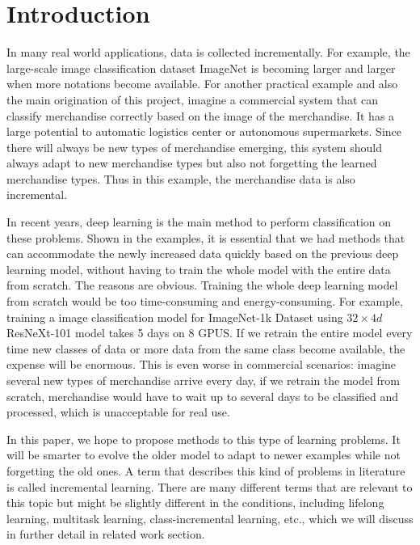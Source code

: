 
\chapter{Introduction}
\label{chap:intro}
In many real world applications, data is collected incrementally. For example, the large-scale image classification dataset ImageNet is becoming larger and larger when more notations become available. For another practical example and also the main origination of this project, imagine a commercial system that can classify merchandise correctly based on the image of the merchandise. It has a large potential to automatic logistics center or autonomous supermarkets. Since there will always be new types of merchandise emerging, this system should always adapt to new merchandise types but also not forgetting the learned merchandise types. Thus in this example, the merchandise data is also incremental.

In recent years, deep learning is the main method to perform classification on these problems. Shown in the examples, it is essential that we had methods that can accommodate the newly increased data quickly based on the previous deep learning model, without having to train the whole model with the entire data from scratch. The reasons are obvious. Training the whole deep learning model from scratch would be too time-consuming and energy-consuming. For example, training a image classification model for ImageNet-1k Dataset\cite{deng2009imagenet} using $32\times4d$ ResNeXt-101\cite{xie2017aggregated} model takes 5 days on 8 GPUS. If we retrain the entire model every time new classes of data or more data from the same class become available, the expense will be enormous. This is even worse in commercial scenarios: imagine several new types of merchandise arrive every day, if we retrain the model from scratch, merchandise would have to wait up to several days to be classified and processed, which is unacceptable for real use.

In this paper, we hope to propose methods to this type of learning problems. It will be smarter to evolve the older model to adapt to newer examples while not forgetting the old ones. A term that describes this kind of problems in literature is called incremental learning. There are many different terms that are relevant to this topic but might be slightly different in the conditions, including lifelong learning, multitask learning, class-incremental learning, etc.\cite{utgoff1989incremental}, which we will discuss in further detail in related work section.

